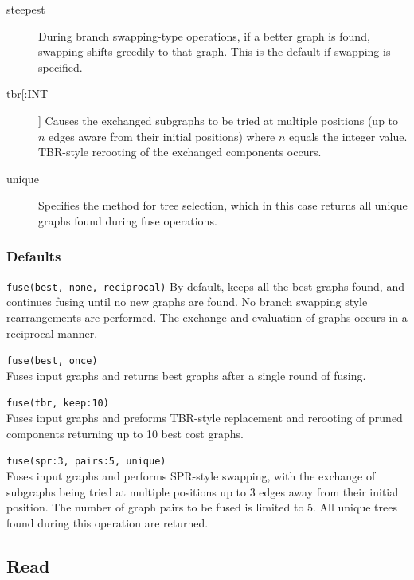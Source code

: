 \begin{description}
		\item [steepest] During branch swapping-type operations, if a better graph is found, swapping 
		shifts greedily to that graph. This is the default if swapping is specified.
		
		\item [tbr[:INT]] Causes the exchanged subgraphs to be tried at multiple positions (up to 
		$n$ edges aware from their initial positions) where $n$ equals the integer value. TBR-style 
		rerooting of the exchanged components occurs.
		
		\item [unique] Specifies the method for tree selection, which in this case returns all unique 
		graphs found during fuse operations.	
	\end{description}	
	
	\subsubsection{Defaults}
		\texttt{fuse(best, none, reciprocal)} By default, \phyg keeps all the best graphs found, and 
		continues fusing until no new graphs are found. No branch swapping style rearrangements 
		are performed. The exchange and evaluation of graphs occurs in a reciprocal manner. 
			
	\begin{example}
		\item{\texttt{fuse(best, once)}\\Fuses input graphs and returns best graphs after a single round of 
		fusing.}
		
		\item{\texttt{fuse(tbr, keep:10)} \\Fuses input graphs and preforms TBR-style replacement and 
		rerooting of pruned components returning up to 10 best cost graphs.}
		
		\item{\texttt{fuse(spr:3, pairs:5, unique)} \\Fuses input graphs and performs SPR-style swapping, 
		with the exchange of subgraphs being tried at multiple positions up to 3 edges away from their 
		initial position. The number of graph pairs to be fused is limited to 5. All unique trees found
		during this operation are returned.}
	\end{example}

\subsection{Read}
\label{subsec:read}
